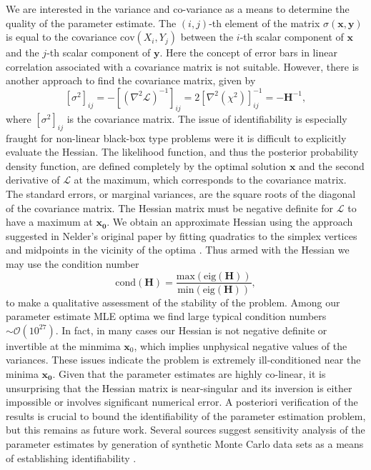 \documentclass[12pt,a4paper,oneside]{book}
\begin{document}
We are interested in the variance and co-variance as a means to determine the quality of the parameter estimate. The $\left( i, j \right)$-th element of the matrix $\sigma (\mathbf{x}, \mathbf{y})$ is equal to the covariance $\mbox{cov}(X_i, Y_j)$ between the $i$-th scalar component of $\mathbf{x}$ and the $j$-th scalar component of $\mathbf{y}$. Here the concept of error bars in linear correlation associated with a covariance matrix is not suitable. However, there is another approach to find the covariance matrix, given by
\[ \left[\sigma^2 \right]_{ij} = -\left[ \left( \nabla^2 \mathcal{L}\right)^{-1}\right]_{ij} = 2 \left[ \nabla^2 \left( \chi^2\right)\right]_{ij}^{-1} = -\mathbf{H}^{-1},\]
where $\left[\sigma^2 \right]_{ij}$ is the covariance matrix. The issue of identifiability is especially fraught for non-linear black-box type problems were it is difficult to explicitly evaluate the Hessian. 
The likelihood function, and thus the posterior probability density function, are defined completely by the optimal solution $\mathbf{x}$ and the second derivative of $\mathcal{L}$ at the maximum, which corresponds to the covariance matrix. The standard errors, or marginal variances, are the square roots of the diagonal of the covariance matrix. The Hessian matrix must be negative definite for $\mathcal{L}$ to have a maximum at $\mathbf{x_0}$. We obtain an approximate Hessian using the approach suggested in Nelder's original paper by fitting quadratics to the simplex vertices and midpoints in the vicinity of the optima \cite{nelder_simplex_1965, spendley_sequential_1962}. Thus armed with the Hessian we may use the condition number
\[ \mbox{cond} (\mathbf{H}) = \frac{\mbox{max}(\mbox{eig}(\mathbf{H}))}{\mbox{min}(\mbox{eig}(\mathbf{H}))}, \]
to make a qualitative assessment of the stability of the problem. Among our parameter estimate MLE optima we find large typical condition numbers $\sim \mathcal{O}(10^{27})$. In fact, in many cases our Hessian is not negative definite or invertible at the minmima $\mathbf{x}_0$, which implies unphysical negative values of the variances. These issues indicate the problem is extremely ill-conditioned near the minima $\mathbf{x_0}$. Given that the parameter estimates are highly co-linear, it is unsurprising that the Hessian matrix is near-singular and its inversion is either impossible or involves significant numerical error. A posteriori verification of the results is crucial to bound the identifiability of the parameter estimation problem, but this remains as future work. Several sources suggest sensitivity analysis of the parameter estimates by generation of synthetic Monte Carlo data sets as a means of establishing identifiability \cite{bevington_data_1969, jaqaman_linking_2006}.
\end{document}

